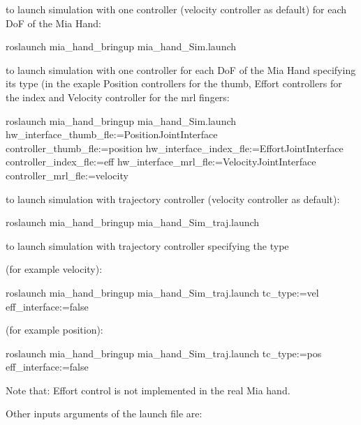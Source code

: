 \begin{DoxyItemize}
\item to launch simulation with one controller (velocity controller as default) for each DoF of the Mia Hand\+: \begin{DoxyVerb}roslaunch mia_hand_bringup mia_hand_Sim.launch
\end{DoxyVerb}

\item to launch simulation with one controller for each DoF of the Mia Hand specifying its type (in the exaple Position controllers for the thumb, Effort controllers for the index and Velocity controller for the mrl fingers\+: \begin{DoxyVerb}roslaunch mia_hand_bringup mia_hand_Sim.launch hw_interface_thumb_fle:=PositionJointInterface controller_thumb_fle:=position hw_interface_index_fle:=EffortJointInterface controller_index_fle:=eff hw_interface_mrl_fle:=VelocityJointInterface controller_mrl_fle:=velocity
\end{DoxyVerb}

\item to launch simulation with trajectory controller (velocity controller as default)\+: \begin{DoxyVerb} roslaunch mia_hand_bringup mia_hand_Sim_traj.launch
\end{DoxyVerb}

\item to launch simulation with trajectory controller specifying the type
\begin{DoxyItemize}
\item (for example velocity)\+: \begin{DoxyVerb}roslaunch mia_hand_bringup mia_hand_Sim_traj.launch tc_type:=vel eff_interface:=false
\end{DoxyVerb}

\item (for example position)\+: \begin{DoxyVerb}roslaunch mia_hand_bringup mia_hand_Sim_traj.launch tc_type:=pos eff_interface:=false
\end{DoxyVerb}

\item Note that\+: Effort control is not implemented in the real Mia hand.
\end{DoxyItemize}
\end{DoxyItemize}

Other inputs arguments of the launch file are\+:

